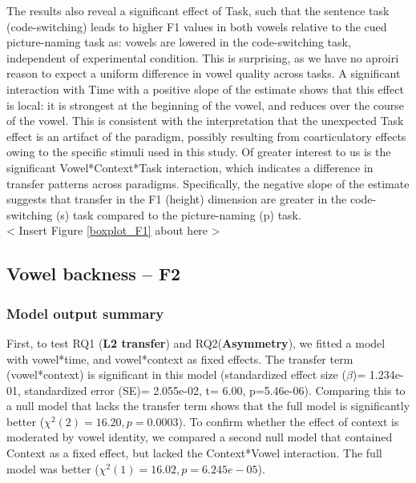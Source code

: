 \documentclass[12 pt]{article}
\begin{document}
The results also reveal a significant effect of Task, such that the sentence task (code-switching) leads to higher F1 values in both vowels relative to the cued picture-naming task as: vowels are lowered in the code-switching task, independent of experimental condition. This is surprising, as we have no aproiri reason to expect a uniform difference in vowel quality across tasks. A significant interaction with Time with a positive slope of the estimate shows that this effect is local: it is strongest at the beginning of the vowel, and reduces over the course of the vowel. This is consistent with the interpretation that the unexpected Task effect is an artifact of the paradigm, possibly resulting from coarticulatory effects owing to the specific stimuli used in this study. Of greater interest to us is the significant Vowel*Context*Task interaction, which indicates a difference in transfer patterns across paradigms. Specifically, the negative slope of the estimate suggests that transfer in the F1 (height) dimension are greater in the code-switching (s) task compared to the picture-naming (p) task.\\


< Insert Figure \ref{boxplot_F1} about here >\\


\subsection{Vowel backness -- F2}

\subsubsection*{Model output summary}

First, to test RQ1 (\textbf{L2 transfer}) and RQ2(\textbf{Asymmetry}), we fitted a model with vowel*time, and vowel*context as fixed effects. The transfer term (vowel*context) is significant in this model (standardized effect size ($\beta$)= 1.234e-01, standardized error (SE)=  2.055e-02, t= 6.00, p=5.46e-06). Comparing this to a null model that lacks the transfer term shows that the full model is significantly better ($\chi^2(2) = 16.20, p= 0.0003$). To confirm whether the effect of context is moderated by vowel identity, we compared a second null model that contained Context as a fixed effect, but lacked the Context*Vowel interaction. The full model was better ($\chi^2(1) = 16.02, p= 6.245e-05$).
  
\end{document}
